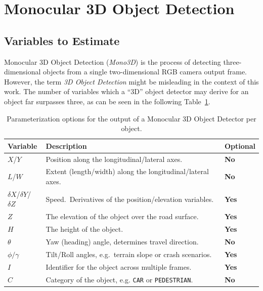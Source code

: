\section{Monocular 3D Object Detection}
\label{sec:monodet}

\subsection{Variables to Estimate}
\label{subsec:estimands}

Monocular 3D Object Detection (\textit{Mono3D}) is the process of detecting three-dimensional objects from a single two-dimensional RGB camera output frame.
However, the term \textit{3D Object Detection} might be misleading in the context of this work.
The number of variables which a \enquote{3D} object detector may derive for an object far surpasses three, as can be seen in the following Table~\ref{tab:mono3d-variables}.

\begin{table}[h]
    \centering
    \caption{Parameterization options for the output of a Monocular 3D Object Detector per object.}
    \label{tab:mono3d-variables}
    \begin{tabular}{lll}
        \toprule
        Variable & Description & Optional \\
        \midrule
        $X$/$Y$ & Position along the longitudinal/lateral axes.\ & \textbf{No} \\
        \midrule
        $L$/$W$ & Extent (length/width) along the longitudinal/lateral axes.\ & \textbf{No} \\
        \midrule
        $\delta X$/$\delta Y$/$\delta Z$ & Speed.\ Derivatives of the position/elevation variables.\ & \textbf{Yes} \\
        \midrule
        $Z$ & The elevation of the object over the road surface.\ & \textbf{Yes} \\
        \midrule
        $H$ & The height of the object.\ & \textbf{Yes} \\
        \midrule
        $\theta$ & Yaw (heading) angle, determines travel direction.\ & \textbf{No} \\
        \midrule
        $\phi/\gamma$ & Tilt/Roll angles, e.g.\ terrain slope or crash scenarios.\ & \textbf{Yes} \\
        \midrule
        $I$ & Identifier for the object across multiple frames.\ & \textbf{Yes} \\
        \midrule
        $C$ & Category of the object, e.g. \texttt{CAR} or \texttt{PEDESTRIAN}.\ & \textbf{No} \\
        \bottomrule
    \end{tabular}
\end{table}

